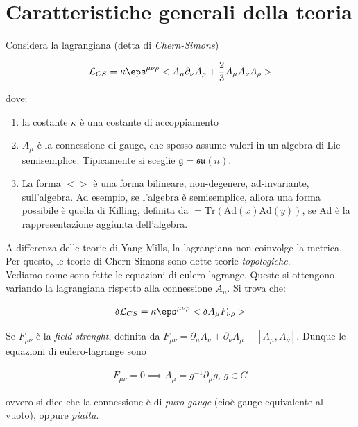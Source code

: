 \documentclass{report}
\begin{document}
\section{Caratteristiche generali della teoria}

Considera la lagrangiana (detta di \emph{Chern-Simons})

\begin{align}
    \mathcal{L}_{CS} = \kappa \eps^{\mu\nu\rho}<A_\mu\partial_\nu A_\rho + \frac{2}{3}A_\mu A_\nu A_\rho> 
\end{align}

dove: 

\begin{enumerate}
    \item la costante \(\kappa\) è una costante di accoppiamento 
    \item \(A_\mu\) è la connessione di gauge, che spesso assume valori in un algebra di Lie semisemplice. Tipicamente si sceglie \(\mathfrak{g} = \mathfrak{su}(n)\). 
    \item La forma \(<>\) è una forma bilineare, non-degenere, ad-invariante, sull'algebra. Ad esempio, se l'algebra è semisemplice, allora una forma possibile è quella di Killing, definita da \(<x, y> = \text{Tr}(\text{Ad}(x)\text{Ad}(y))\), se Ad è la rappresentazione aggiunta dell'algebra. 
\end{enumerate}

A differenza delle teorie di Yang-Mills, la lagrangiana non coinvolge la metrica. Per questo, le teorie di Chern Simons sono dette teorie \emph{topologiche}. \\

Vediamo come sono fatte le equazioni di eulero lagrange. Queste si ottengono variando la lagrangiana rispetto alla connessione \(A_\mu\). Si trova che: 

\begin{align}
    \delta\mathcal{L}_{CS} = \kappa\eps^{\mu\nu\rho}<\delta A_\mu F_{\nu\rho}>
\end{align}

Se \(F_{\mu\nu}\) è la \emph{field strenght}, definita da \(F_{\mu\nu} = \partial_\mu A_\nu + \partial_\nu A_{\mu} + [A_\mu, A_\nu]\). Dunque le equazioni di eulero-lagrange sono 

\begin{align}
    F_{\mu\nu} = 0 \implies A_\mu = g^{-1}\partial_\mu g, \, g \in G
\end{align}

ovvero si dice che la connessione è di \emph{puro gauge} (cioè gauge equivalente al vuoto), oppure \emph{piatta}. \\
\end{document}

